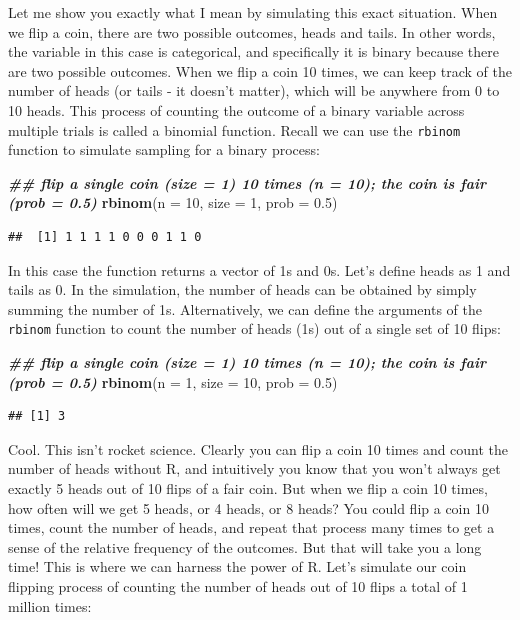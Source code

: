 \documentclass[
]{book}
\newenvironment{Shaded}{\begin{snugshade}}{\end{snugshade}}
\newcommand{\AttributeTok}[1]{\textcolor[rgb]{0.13,0.29,0.53}{#1}}
\newcommand{\DecValTok}[1]{\textcolor[rgb]{0.00,0.00,0.81}{#1}}
\newcommand{\DocumentationTok}[1]{\textcolor[rgb]{0.56,0.35,0.01}{\textbf{\textit{#1}}}}
\newcommand{\FloatTok}[1]{\textcolor[rgb]{0.00,0.00,0.81}{#1}}
\newcommand{\FunctionTok}[1]{\textcolor[rgb]{0.13,0.29,0.53}{\textbf{#1}}}
\newcommand{\NormalTok}[1]{#1}
\begin{document}
Let me show you exactly what I mean by simulating this exact situation. When we flip a coin, there are two possible outcomes, heads and tails. In other words, the variable in this case is categorical, and specifically it is binary because there are two possible outcomes. When we flip a coin 10 times, we can keep track of the number of heads (or tails - it doesn't matter), which will be anywhere from 0 to 10 heads. This process of counting the outcome of a binary variable across multiple trials is called a binomial function. Recall we can use the \texttt{rbinom} function to simulate sampling for a binary process:

\begin{Shaded}
\begin{Highlighting}[]
\DocumentationTok{\#\# flip a single coin (size = 1) 10 times (n = 10); the coin is fair (prob = 0.5)}
\FunctionTok{rbinom}\NormalTok{(}\AttributeTok{n =} \DecValTok{10}\NormalTok{, }\AttributeTok{size =} \DecValTok{1}\NormalTok{, }\AttributeTok{prob =} \FloatTok{0.5}\NormalTok{)}
\end{Highlighting}
\end{Shaded}

\begin{verbatim}
##  [1] 1 1 1 1 0 0 0 1 1 0
\end{verbatim}

In this case the function returns a vector of 1s and 0s. Let's define heads as 1 and tails as 0. In the simulation, the number of heads can be obtained by simply summing the number of 1s. Alternatively, we can define the arguments of the \texttt{rbinom} function to count the number of heads (1s) out of a single set of 10 flips:

\begin{Shaded}
\begin{Highlighting}[]
\DocumentationTok{\#\# flip a single coin (size = 1) 10 times (n = 10); the coin is fair (prob = 0.5)}
\FunctionTok{rbinom}\NormalTok{(}\AttributeTok{n =} \DecValTok{1}\NormalTok{, }\AttributeTok{size =} \DecValTok{10}\NormalTok{, }\AttributeTok{prob =} \FloatTok{0.5}\NormalTok{)}
\end{Highlighting}
\end{Shaded}

\begin{verbatim}
## [1] 3
\end{verbatim}

Cool. This isn't rocket science. Clearly you can flip a coin 10 times and count the number of heads without R, and intuitively you know that you won't always get exactly 5 heads out of 10 flips of a fair coin. But when we flip a coin 10 times, how often will we get 5 heads, or 4 heads, or 8 heads? You could flip a coin 10 times, count the number of heads, and repeat that process many times to get a sense of the relative frequency of the outcomes. But that will take you a long time! This is where we can harness the power of R. Let's simulate our coin flipping process of counting the number of heads out of 10 flips a total of 1 million times:
\end{document}

